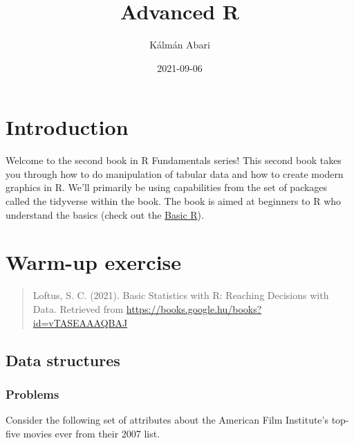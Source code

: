 \documentclass[
]{book}
\title{Advanced R}
\author{Kálmán Abari}
\date{2021-09-06}
\begin{document}
\maketitle

{
\setcounter{tocdepth}{1}
\tableofcontents
}
\hypertarget{introduction}{%
\chapter{Introduction}\label{introduction}}

Welcome to the second book in R Fundamentals series! This second book takes you through how to do manipulation of tabular data and how to create modern graphics in R. We'll primarily be using capabilities from the set of packages called the tidyverse within the book. The book is aimed at beginners to R who understand the basics (check out the \href{https://abarik.github.io/basicr_2020_21_2/}{Basic R}).

\hypertarget{warm-up-exercise}{%
\chapter{Warm-up exercise}\label{warm-up-exercise}}

\begin{quote}
Loftus, S. C. (2021). Basic Statistics with R: Reaching Decisions with Data. Retrieved from \url{https://books.google.hu/books?id=vTASEAAAQBAJ}
\end{quote}

\hypertarget{data-structures}{%
\section{Data structures}\label{data-structures}}

\hypertarget{problems}{%
\subsection{Problems}\label{problems}}

Consider the following set of attributes about the American Film Institute's top-five movies ever from their 2007 list.
\end{document}
